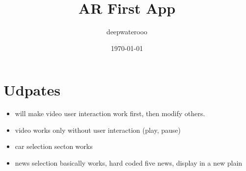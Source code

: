 \documentclass[9pt, b5paper]{article}
\author{deepwaterooo}
\date{\today}
\title{AR First App}
\begin{document}
\maketitle
\tableofcontents


\section{Udpates}
\label{sec-1}
\begin{itemize}
\item will make video user interaction work first, then modify others.
\item video works only without user interaction (play, pause)
\item car selection secton works
\item news selection basically works, hard coded five news, display in a new plain
\end{itemize}
\end{document}
